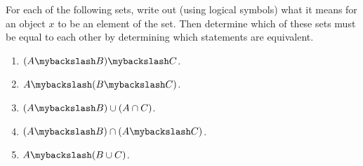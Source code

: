 For each of the following sets, write out (using logical symbols) what it means for an object $x$ to be an element of the set. Then determine which of these sets must be equal to each other by determining which statements are equivalent.

\begin{enumerate}[label=(\alph*)]
    \item $(A \mybackslash B) \mybackslash C$.
    \item $A \mybackslash (B \mybackslash C)$.
    \item $(A \mybackslash B) \cup (A \cap C)$.
    \item $(A \mybackslash B) \cap (A \mybackslash C)$.
    \item $A \mybackslash (B \cup C)$.
\end{enumerate}

